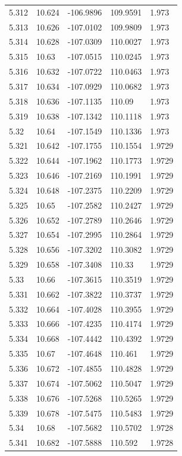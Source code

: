 \begin{tabular}{lllll}
5.312 & 10.624 & -106.9896 & 109.9591 & 1.973 \\
5.313 & 10.626 & -107.0102 & 109.9809 & 1.973 \\
5.314 & 10.628 & -107.0309 & 110.0027 & 1.973 \\
5.315 & 10.63 & -107.0515 & 110.0245 & 1.973 \\
5.316 & 10.632 & -107.0722 & 110.0463 & 1.973 \\
5.317 & 10.634 & -107.0929 & 110.0682 & 1.973 \\
5.318 & 10.636 & -107.1135 & 110.09 & 1.973 \\
5.319 & 10.638 & -107.1342 & 110.1118 & 1.973 \\
5.32 & 10.64 & -107.1549 & 110.1336 & 1.973 \\
5.321 & 10.642 & -107.1755 & 110.1554 & 1.9729 \\
5.322 & 10.644 & -107.1962 & 110.1773 & 1.9729 \\
5.323 & 10.646 & -107.2169 & 110.1991 & 1.9729 \\
5.324 & 10.648 & -107.2375 & 110.2209 & 1.9729 \\
5.325 & 10.65 & -107.2582 & 110.2427 & 1.9729 \\
5.326 & 10.652 & -107.2789 & 110.2646 & 1.9729 \\
5.327 & 10.654 & -107.2995 & 110.2864 & 1.9729 \\
5.328 & 10.656 & -107.3202 & 110.3082 & 1.9729 \\
5.329 & 10.658 & -107.3408 & 110.33 & 1.9729 \\
5.33 & 10.66 & -107.3615 & 110.3519 & 1.9729 \\
5.331 & 10.662 & -107.3822 & 110.3737 & 1.9729 \\
5.332 & 10.664 & -107.4028 & 110.3955 & 1.9729 \\
5.333 & 10.666 & -107.4235 & 110.4174 & 1.9729 \\
5.334 & 10.668 & -107.4442 & 110.4392 & 1.9729 \\
5.335 & 10.67 & -107.4648 & 110.461 & 1.9729 \\
5.336 & 10.672 & -107.4855 & 110.4828 & 1.9729 \\
5.337 & 10.674 & -107.5062 & 110.5047 & 1.9729 \\
5.338 & 10.676 & -107.5268 & 110.5265 & 1.9729 \\
5.339 & 10.678 & -107.5475 & 110.5483 & 1.9729 \\
5.34 & 10.68 & -107.5682 & 110.5702 & 1.9728 \\
5.341 & 10.682 & -107.5888 & 110.592 & 1.9728 \\

\end{tabular}
